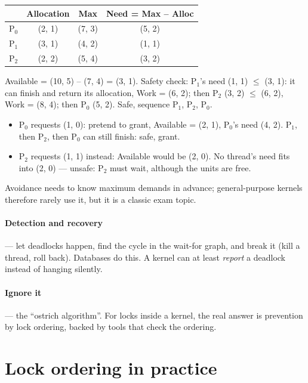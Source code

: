 \begin{center}
\begin{tabular}{lccc}
\toprule
 & \textbf{Allocation} & \textbf{Max} & \textbf{Need = Max -- Alloc} \\
\midrule
P$_0$ & (2, 1) & (7, 3) & (5, 2) \\
P$_1$ & (3, 1) & (4, 2) & (1, 1) \\
P$_2$ & (2, 2) & (5, 4) & (3, 2) \\
\bottomrule
\end{tabular}
\end{center}

Available = (10, 5) -- (7, 4) = (3, 1). Safety check: P$_1$'s need (1, 1)
$\le$ (3, 1): it can finish and return its allocation, Work = (6, 2);
then P$_2$ (3, 2) $\le$ (6, 2), Work = (8, 4); then P$_0$ (5, 2). Safe,
sequence P$_1$, P$_2$, P$_0$.
\begin{itemize}
  \item P$_0$ requests (1, 0): pretend to grant, Available = (2, 1), P$_0$'s
    need (4, 2). P$_1$, then P$_2$, then P$_0$ can still finish: safe,
    grant.
  \item P$_2$ requests (1, 1) instead: Available would be (2, 0). No
    thread's need fits into (2, 0) --- unsafe: P$_2$ must wait, although
    the units are free.
\end{itemize}
Avoidance needs to know maximum demands in advance; general-purpose
kernels therefore rarely use it, but it is a classic exam topic.

\paragraph{Detection and recovery} --- let deadlocks happen, find the
cycle in the wait-for graph, and break it (kill a thread, roll back).
Databases do this. A kernel can at least \emph{report} a deadlock instead
of hanging silently.

\paragraph{Ignore it} --- the ``ostrich algorithm''. For locks inside a
kernel, the real answer is prevention by lock ordering, backed by tools
that check the ordering.

\section{Lock ordering in practice}

